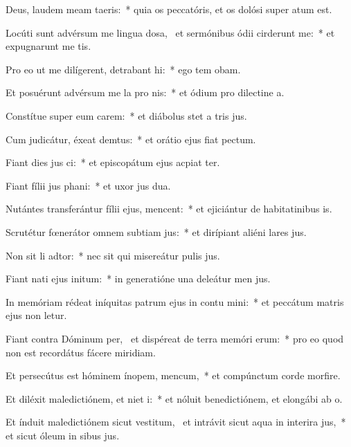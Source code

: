 \item Deus, laudem meam  taeris:~* quia os peccatóris, et os dolósi super  atum est.
\item Locúti sunt advérsum me lingua dosa,~\pscross{} et sermónibus ódii cirderunt me:~* et expugnarunt me tis.
\item Pro eo ut me dilígerent, detrabant hi:~* ego tem obam.
\item Et posuérunt advérsum me la pro nis:~* et ódium pro dilectine a.
\item Constítue super eum carem:~* et diábolus stet a tris jus.
\item Cum judicátur, éxeat demtus:~* et orátio ejus fiat  pectum.
\item Fiant dies jus ci:~* et episcopátum ejus acpiat ter.
\item Fiant fílii jus phani:~* et uxor jus dua.
\item Nutántes transferántur fílii ejus,  mencent:~* et ejiciántur de habitatinibus is.
\item Scrutétur fœnerátor omnem subtiam jus:~* et dirípiant aliéni lares jus.
\item Non sit li adtor:~* nec sit qui misereátur pulis jus.
\item Fiant nati ejus  initum:~* in generatióne una deleátur men jus.
\item In memóriam rédeat iníquitas patrum ejus in contu mini:~* et peccátum matris ejus non letur.
\item Fiant contra Dóminum per,~\pscross{} et dispéreat de terra memóri erum:~* pro eo quod non est recordátus fácere miridiam.
\item Et persecútus est hóminem ínopem,  mencum,~* et compúnctum corde morfire.
\item Et diléxit maledictiónem, et niet i:~* et nóluit benedictiónem, et elongábi ab o.
\item Et índuit maledictiónem sicut vestitum,~\pscross{} et intrávit sicut aqua in interira jus,~* et sicut óleum in sibus jus.

